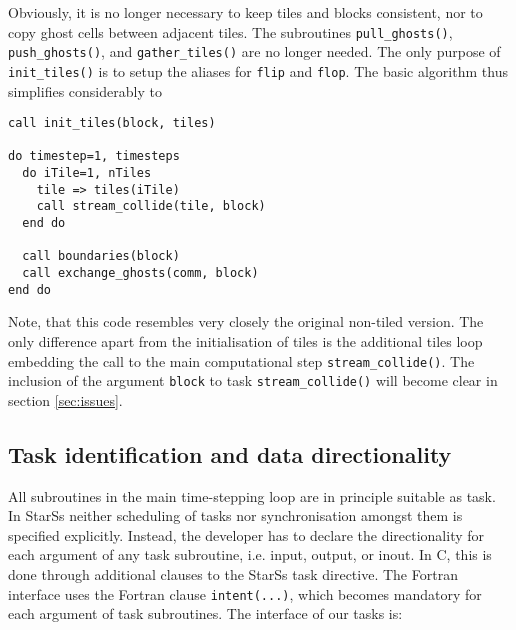 \documentclass[conference]{IEEEtran}
\newcommand{\starss}{{StarSs}}
\begin{document}
Obviously, it is no longer necessary to keep tiles and blocks
consistent, nor to copy ghost cells between adjacent tiles. The
subroutines \verb!pull_ghosts()!, \verb!push_ghosts()!, and
\verb!gather_tiles()! are no longer needed. The only purpose of
\verb!init_tiles()! is to setup the aliases for \verb!flip! and
\verb!flop!. The basic algorithm thus simplifies considerably to
\begin{lstlisting}
call init_tiles(block, tiles)

do timestep=1, timesteps
  do iTile=1, nTiles
    tile => tiles(iTile)
    call stream_collide(tile, block)
  end do

  call boundaries(block)
  call exchange_ghosts(comm, block)
end do
\end{lstlisting}
Note, that this code resembles very closely the original non-tiled
version. The only difference apart from the initialisation of tiles is
the additional tiles loop embedding the call to the main computational
step \verb!stream_collide()!. The inclusion of the argument
\verb!block! to task \verb!stream_collide()! will become clear in
section \ref{sec:issues}.

\subsection{Task identification and data directionality}
\label{sec:tasks}

All subroutines in the main time-stepping loop are in principle suitable as
task. In \starss{} neither scheduling of tasks nor synchronisation amongst
them is specified explicitly. Instead, the developer has to declare the
directionality for each argument of any task subroutine, i.e. input, output,
or inout. In C, this is done through additional clauses to the \starss{} task
directive. The Fortran interface uses the Fortran clause \verb!intent(...)!,
which becomes mandatory for each argument of task subroutines. The interface
of our tasks is:
\end{document}
